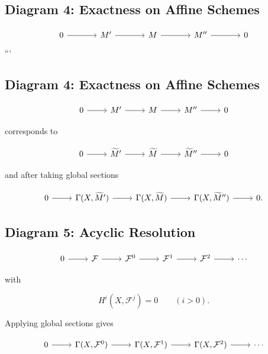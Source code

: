 \documentclass[12pt,a4paper]{article}
\theoremstyle{notespace}
\begin{document}
\subsection{Diagram 4: Exactness on Affine Schemes}

\[
\begin{tikzcd}[column sep=large]
	0
	\arrow[r]
	&
	M'
	\arrow[r]
	&
	M
	\arrow[r]
	&
	M''
	\arrow[r]
	&
	0
\end{tikzcd}
\]
```


\subsection{Diagram 4: Exactness on Affine Schemes}

\[
\begin{tikzcd}
	0
	\arrow[r]
	&
	M'
	\arrow[r]
	&
	M
	\arrow[r]
	&
	M''
	\arrow[r]
	&
	0
\end{tikzcd}
\]

corresponds to

\[
\begin{tikzcd}
	0
	\arrow[r]
	&
	\widetilde M'
	\arrow[r]
	&
	\widetilde M
	\arrow[r]
	&
	\widetilde M''
	\arrow[r]
	&
	0
\end{tikzcd}
\]

and after taking global sections

\[
\begin{tikzcd}
	0
	\arrow[r]
	&
	\Gamma(X,\widetilde M')
	\arrow[r]
	&
	\Gamma(X,\widetilde M)
	\arrow[r]
	&
	\Gamma(X,\widetilde M'')
	\arrow[r]
	&
	0.
\end{tikzcd}
\]

\subsection{Diagram 5: Acyclic Resolution}

\[
\begin{tikzcd}
	0
	\arrow[r]
	&
	\mathcal F
	\arrow[r]
	&
	\mathcal F^0
	\arrow[r]
	&
	\mathcal F^1
	\arrow[r]
	&
	\mathcal F^2
	\arrow[r]
	&
	\cdots
\end{tikzcd}
\]

with

\[
H^i(X,\mathcal F^j)=0
\qquad
(i>0).
\]

Applying global sections gives

\[
\begin{tikzcd}
	0
	\arrow[r]
	&
	\Gamma(X,\mathcal F^0)
	\arrow[r]
	&
	\Gamma(X,\mathcal F^1)
	\arrow[r]
	&
	\Gamma(X,\mathcal F^2)
	\arrow[r]
	&
	\cdots
\end{tikzcd}
\]
\end{document}
